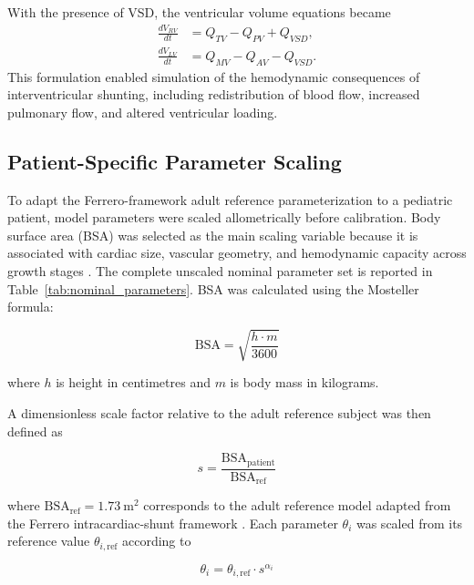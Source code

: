 \documentclass{article}
\begin{document}
With the presence of VSD, the ventricular volume equations became
\begin{align}
\frac{dV_{RV}}{dt} &= Q_{TV} - Q_{PV} + Q_{VSD},
\label{eq:VRV_vsd} \\
\frac{dV_{LV}}{dt} &= Q_{MV} - Q_{AV} - Q_{VSD}.
\label{eq:VLV_vsd}
\end{align}
This formulation enabled simulation of the hemodynamic consequences of interventricular shunting, including redistribution of blood flow, increased pulmonary flow, and altered ventricular loading.

\subsection{Patient-Specific Parameter Scaling}
\label{sec:scaling}

To adapt the Ferrero-framework adult reference parameterization \cite{Ferrero2026Shunts} to a pediatric patient, model parameters were scaled allometrically before calibration. Body surface area (BSA) was selected as the main scaling variable because it is associated with cardiac size, vascular geometry, and hemodynamic capacity across growth stages \cite{Lundquist2025}. The complete unscaled nominal parameter set is reported in Table~\ref{tab:nominal_parameters}. BSA was calculated using the Mosteller formula:

\begin{equation}
    \mathrm{BSA} = \sqrt{\frac{h \cdot m}{3600}}
    \label{eq:mosteller}
\end{equation}

\noindent where $h$ is height in centimetres and $m$ is body mass in kilograms.

A dimensionless scale factor relative to the adult reference subject was then defined as

\begin{equation}
    s = \frac{\mathrm{BSA}_{\mathrm{patient}}}{\mathrm{BSA}_{\mathrm{ref}}}
    \label{eq:scale_factor}
\end{equation}

\noindent where $\mathrm{BSA}_{\mathrm{ref}} = 1.73\ \mathrm{m}^2$ corresponds to the adult reference model adapted from the Ferrero intracardiac-shunt framework \cite{Ferrero2026Shunts}. Each parameter $\theta_i$ was scaled from its reference value $\theta_{i,\mathrm{ref}}$ according to

\begin{equation}
    \theta_i = \theta_{i,\mathrm{ref}} \cdot s^{\alpha_i}
    \label{eq:general_scaling}
\end{equation}
\end{document}
